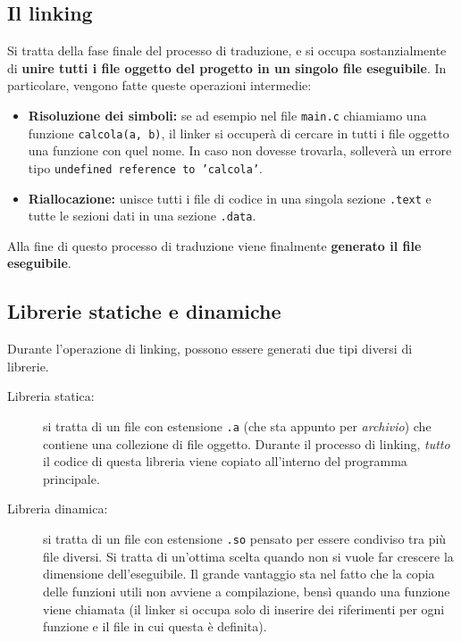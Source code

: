 \documentclass[12pt]{report}
\begin{document}
	\subsection{Il linking}
	Si tratta della fase finale del processo di traduzione, e si occupa sostanzialmente di \textbf{unire tutti i file oggetto del progetto in un singolo file eseguibile}.
	In particolare, vengono fatte queste operazioni intermedie:
	\begin{itemize}
		\item \textbf{Risoluzione dei simboli:} se ad esempio nel file \texttt{main.c} chiamiamo una funzione \texttt{calcola(a, b)}, il linker si occuperà di cercare in tutti i file oggetto una funzione con quel nome. In caso non dovesse trovarla, solleverà un errore tipo \texttt{undefined reference to 'calcola'}.
		
		\item \textbf{Riallocazione:} unisce tutti i file di codice in una singola sezione \texttt{.text} e tutte le sezioni dati in una sezione \texttt{.data}.
	\end{itemize}
	
	Alla fine di questo processo di traduzione viene finalmente \textbf{generato il file eseguibile}.
	
	\subsection{Librerie statiche e dinamiche}
	Durante l'operazione di linking, possono essere generati due tipi diversi di librerie.
	\begin{description}
		\item [Libreria statica:] si tratta di un file con estensione \texttt{.a} (che sta appunto per \textit{archivio}) che contiene una collezione di file oggetto. Durante il processo di linking, \textit{tutto} il codice di questa libreria viene copiato all'interno del programma principale.\\
		
		\item[Libreria dinamica:] si tratta di un file con estensione \texttt{.so} pensato per essere condiviso tra più file diversi. Si tratta di un'ottima scelta quando non si vuole far crescere la dimensione dell'eseguibile. Il grande vantaggio sta nel fatto che la copia delle funzioni utili non avviene a compilazione, bensì quando una funzione viene chiamata (il linker si occupa solo di inserire dei riferimenti per ogni funzione e il file in cui questa è definita).
	\end{description}
	
\end{document}
